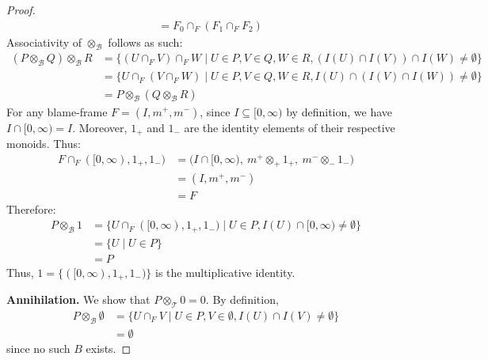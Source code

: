 \documentclass[
]{ceurart}
\theoremstyle{plain}
\begin{document}
\begin{proof}
\begin{align*}
        &= F_0 \cap_F (F_1 \cap_F F_2)
    \end{align*}
    Associativity of $\otimes_\mathcal{B}$ follows as such:
    \begin{align*}
        (P \otimes_\mathcal{B} Q) \otimes_\mathcal{B} R
        &= \{(U \cap_F V) \cap_F W \mid U\in P, V\in Q, W \in R, (I(U) \cap I(V)) \cap I(W) \neq \emptyset \}\\
        &= \{U \cap_F (V \cap_F W) \mid U\in P, V\in Q, W \in R, I(U) \cap (I(V) \cap I(W)) \neq \emptyset \}\\
        &= P \otimes_\mathcal{B} (Q \otimes_\mathcal{B} R)
    \end{align*}
    For any blame-frame $F = (I, m^+, m^-)$, since $I \subseteq [0, \infty)$ by definition, we have $I \cap [0, \infty) = I$. Moreover, $1_{+}$ and $1_{-}$ are the identity elements of their respective monoids. Thus:
    \begin{align*}
        F \cap_F ([0, \infty), 1_{+}, 1_{-})
        &= \big(I \cap [0, \infty),\ m^+\otimes_{+} 1_{+},\ m^-\otimes_{-} 1_{-}\big) \\
        &= (I, m^+, m^-) \\
        &= F
    \end{align*}
    Therefore:
    \begin{align*}
        P \otimes_\mathcal{B} 1
        &= \{U \cap_F ([0, \infty), 1_{+}, 1_{-}) \mid U \in P, I(U) \cap [0, \infty) \neq \emptyset \} \\
        &= \{U \mid U \in P\} \\
        &= P
    \end{align*}
    Thus, $1 = \{([0, \infty), 1_{+}, 1_{-})\}$ is the multiplicative identity.
    
    \textbf{Annihilation.} We show that $P \otimes_\mathcal{T} 0 = 0$. By definition,
    \begin{align*}
        P \otimes_\mathcal{B} \emptyset
        &= \{U \cap_F V \mid U\in P, V\in \emptyset, I(U) \cap I(V) \neq \emptyset \} \\
        &= \emptyset 
    \end{align*}
    since no such $B$ exists.


\end{proof}
\end{document}

